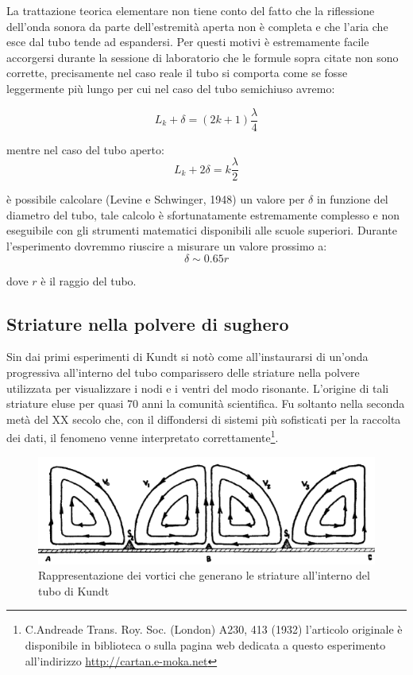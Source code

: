 \documentclass[a4paper,10pt,oneside]{article}
\begin{document}
La trattazione teorica elementare non tiene conto del fatto che la riflessione dell'onda sonora da parte dell'estremità aperta non è completa e che l'aria che esce dal tubo tende ad espandersi. Per questi motivi è estremamente facile accorgersi durante la sessione di laboratorio che le formule sopra citate non sono corrette, precisamente nel caso reale il tubo si comporta come se fosse leggermente più lungo per cui nel caso del tubo semichiuso avremo:


\begin{equation}
 L_k+\delta=(2k+1)\frac{\lambda}{4}
\end{equation}

mentre nel caso del tubo aperto:
\begin{equation}
 L_k+2\delta=k\frac{\lambda}{2}
\end{equation}

è possibile calcolare (Levine  e Schwinger, 1948) un valore per $\delta$ in funzione del diametro del tubo, tale calcolo è sfortunatamente estremamente complesso e non eseguibile con gli strumenti matematici disponibili alle scuole superiori. 
Durante l'esperimento dovremmo riuscire a misurare un valore prossimo a:
\begin{equation}
 \delta\sim 0.65r
\end{equation}

dove $r$ è il raggio del tubo.

\subsection*{Striature nella polvere di sughero}

Sin dai primi esperimenti di Kundt si notò come all'instaurarsi di un'onda progressiva all'interno del tubo comparissero delle striature nella polvere utilizzata per visualizzare i nodi e i ventri del modo risonante. L'origine di tali striature eluse per quasi 70 anni la comunità scientifica. Fu soltanto nella seconda metà del XX secolo che, con il diffondersi di sistemi più sofisticati per la raccolta dei dati, il fenomeno venne interpretato correttamente\footnote{C.Andreade Trans. Roy. Soc. (London) A230, 413 (1932) l'articolo originale è disponibile in biblioteca o sulla pagina web dedicata a questo esperimento all'indirizzo \url{http://cartan.e-moka.net}}.


\begin{figure}[H]
 \centering
 \includegraphics[width=\textwidth]{../Immagini/cork2.png}
 \caption{Rappresentazione dei vortici che generano le striature all'interno del tubo di Kundt}
 \label{fig:cork2}
\end{figure}
\end{document}
